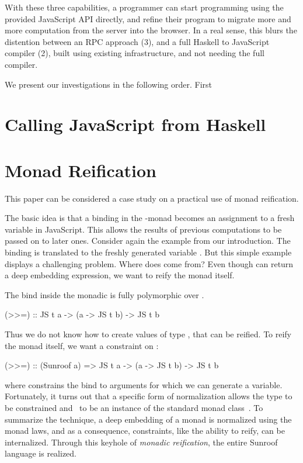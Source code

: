 With these three capabilities, a programmer can start programming
using the provided JavaScript API directly, and refine
their program to migrate more and more computation
from the server into the browser. In a real sense,
this blurs the distention between an RPC approach (3),
and a full Haskell to JavaScript compiler (2),
built using existing infrastructure, and not needing
the full compiler.

We present our investigations in the following order.
First


\section{Calling JavaScript from Haskell}



\section{Monad Reification}


This paper can be considered a case study on 
a practical use of monad reification.

The basic idea is that a binding in the \JS-monad becomes an
assignment to a fresh variable in JavaScript. 
This allows the results of previous computations to be passed on to 
later ones.
Consider again the example from our introduction.
The binding  is translated to the freshly generated
variable .
But this simple example displays a challenging problem. Where does
 come from? Even though  can return a deep embedding 
expression, we want to reify the monad itself.

The bind inside the monadic  is
fully polymorphic over .
\begin{Code}
(>>=) :: JS t a -> (a -> JS t b) -> JS t b
\end{Code}
Thus we do not know how to create values of type ,
that can be reified.
To reify the monad itself, we want a constraint on :
\begin{Code}
(>>=) :: (Sunroof a) => JS t a -> (a -> JS t b) -> JS t b
\end{Code}
where  constrains the bind to
arguments for which we can generate a variable.
Fortunately, it turns out that a specific form of normalization allows 
the type  to be constrained and \JS~to 
be an instance of the standard monad class~\cite{Sculthorpe:13:ConstrainedMonads}.
To summarize the technique, a deep embedding of a monad is normalized using the monad laws,
and as a consequence, constraints, like the ability to reify, can be internalized.
Through this keyhole of {\em monadic reification},
the entire Sunroof language is realized.


